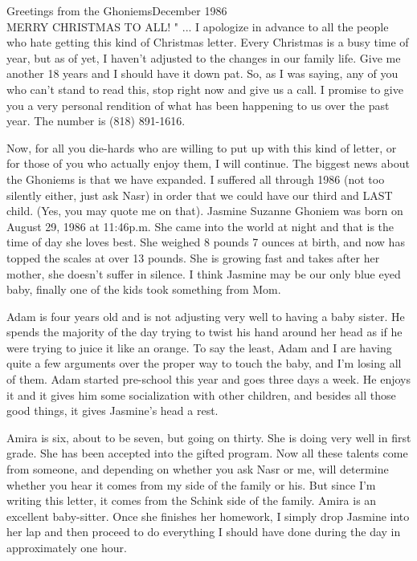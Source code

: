 
%

Greetings from the Ghoniems\hfill December 1986\\

MERRY CHRISTMAS TO ALL! "  ... I apologize in advance to all the people who hate getting this kind of Christmas letter.  Every Christmas is a
busy time of year, but as of yet, I haven't adjusted to the changes in our family life.  Give me another 18 years and I should have it down pat.
So, as I was saying, any of you who can't stand to read this, stop right now and give us a call.  I promise to give you a very personal
rendition of what has been happening to us over the past year.  The number is (818) 891-1616.

Now, for all you die-hards who are willing to put up with this kind of letter, or for those of you who actually enjoy them, I will continue. The
biggest news about the Ghoniems is that we have expanded.  I suffered all through 1986 (not too silently either, just ask Nasr) in order that we
could have our third and LAST child. (Yes, you may quote me on that).  Jasmine Suzanne Ghoniem was born on August 29, 1986 at 11:46p.m. She came
into the world at night and that is the time of day she loves best.   She weighed 8 pounds 7 ounces at birth, and now has topped the scales at
over 13 pounds.  She is growing fast and takes after her mother, she doesn't suffer in silence. I think Jasmine may be our only blue eyed baby,
finally one of the kids took something from Mom.

Adam is four years old and is not adjusting very well to having a baby sister.  He spends the majority of the day trying to twist his hand
around her head as if he were trying to juice it like an orange. To say the least, Adam and I are having quite a few arguments over the proper
way to touch the baby, and I'm losing all of them.  Adam started pre-school this year and goes three days a week.  He enjoys it and it gives him
some socialization with other children, and besides all those good things, it gives Jasmine's head a rest.

Amira is six, about to be seven, but going on thirty.  She is doing very well in first grade.  She has been accepted into the gifted program.
Now all these talents come from someone, and depending on whether you ask Nasr or me, will determine whether you hear it comes from my side of
the family or his.  But since I'm writing this letter, it comes from the Schink side of the family.  Amira is an excellent baby-sitter.  Once
she finishes her homework, I simply drop Jasmine into her lap and then proceed to do everything I should have done during the day in
approximately one hour.

